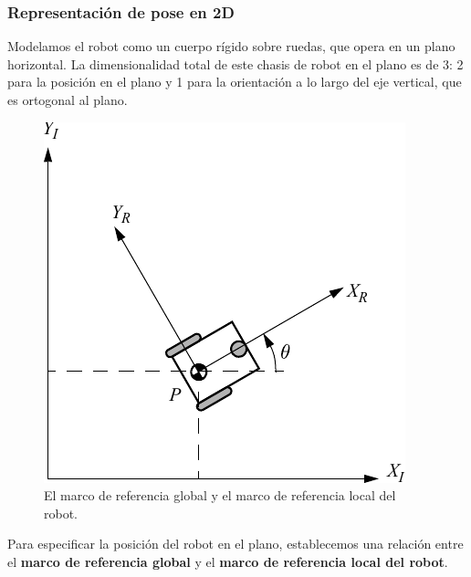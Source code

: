 \begin{frame}
    \frametitle{Representación de pose en 2D}
    \footnotesize
    Modelamos el robot como un cuerpo rígido sobre ruedas, que opera en un plano horizontal. La dimensionalidad total de este chasis de robot en el plano es de 3: 2 para la posición en el plano y 1 para la orientación a lo largo del eje vertical, que es ortogonal al plano.

    \begin{figure}[!h]
        \includegraphics[width=0.3\columnwidth]{./images/coordinate_systems.pdf}
        \caption{El marco de referencia global y el marco de referencia local del robot.}
    \end{figure}

    Para especificar la posición del robot en el plano, establecemos una relación entre el {\bf marco de referencia global} y el {\bf marco de referencia local del robot}.

\end{frame}


